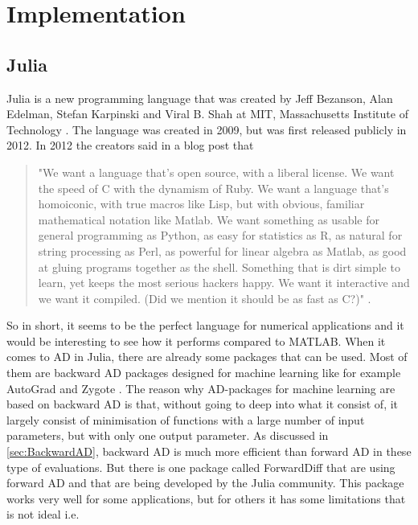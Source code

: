 \chapter{Implementation}
\section{Julia}
\label{sec:Julia}
Julia is a new programming language that was created by Jeff Bezanson, Alan Edelman, Stefan Karpinski and Viral B. Shah  at MIT, Massachusetts Institute of Technology \emph{\citep{juliaLab}}. The language was created in 2009, but was first released publicly in 2012. In 2012 the creators said in a blog post that
\begin{quotation}
"We want a language that’s open source, with a liberal license. We want the speed of C with the dynamism of Ruby. We want a language that’s homoiconic, with true macros like Lisp, but with obvious, familiar mathematical notation like Matlab. We want something as usable for general programming as Python, as easy for statistics as R, as natural for string processing as Perl, as powerful for linear algebra as Matlab, as good at gluing programs together as the shell. Something that is dirt simple to learn, yet keeps the most serious hackers happy. We want it interactive and we want it compiled. (Did we mention it should be as fast as C?)"\emph{\citep{juliaBlogRelease2012}} .
\end{quotation}
So in short, it seems to be the perfect language for numerical applications and it would be interesting to see how it performs compared to MATLAB. When it comes to AD in Julia, there are already some packages that can be used. Most of them are backward AD packages designed for machine learning like for example AutoGrad \emph{\citep{knet2016mlsys}} and Zygote \emph{\citep{innes2018don}}. The reason why AD-packages for machine learning are based on backward AD is that, without going to deep into what it consist of, it largely consist of minimisation of functions with a large number of input parameters, but with only one output parameter. As discussed in \autoref{sec:BackwardAD}, backward AD is much more efficient than forward AD in these type of evaluations. But there is one package called ForwardDiff \emph{\citep{ForwardDiff}} that are using forward AD and that are being developed by the Julia community. This package works very well for some applications, but for others it has some limitations that is not ideal i.e. 
